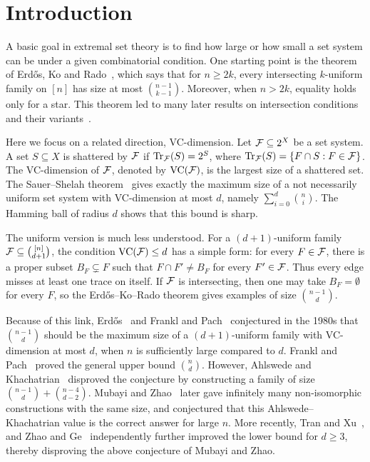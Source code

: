 \section{Introduction}

A basic goal in extremal set theory is to find how large or how small a set system can be under a given combinatorial condition. One starting point is the theorem of Erd\H{o}s, Ko and Rado~\cite{1961EKR}, which says that for \(n\ge2k\), every intersecting \(k\)-uniform family on \([n]\) has size at most \(\binom{n-1}{k-1}\). Moreover, when \(n>2k\), equality holds only for a star. This theorem led to many later results on intersection conditions and their variants~\cite{1989Chuan,2017PAMSHan,1967HM,2017HuangZhao,2024PengHuang,1986Pyber}.

Here we focus on a related direction, VC-dimension. Let \(\mathcal{F}\subseteq 2^X\) be a set system. A set \(S\subseteq X\) is shattered by \(\mathcal{F}\) if \(\operatorname{Tr}_{\mathcal{F}}(S)=2^S\), where \(\operatorname{Tr}_{\mathcal{F}}(S)=\{F\cap S:F\in\mathcal{F}\}\). The VC-dimension of \(\mathcal{F}\), denoted by \(\operatorname{VC}(\mathcal{F})\), is the largest size of a shattered set. The Sauer--Shelah theorem~\cite{1972JCTASauer,1972PACJMShelah,1971TPAVCVC} gives exactly the maximum size of a not necessarily uniform set system with VC-dimension at most \(d\), namely \(\sum_{i=0}^d\binom{n}{i}\). The Hamming ball of radius \(d\) shows that this bound is sharp.

The uniform version is much less understood. For a \((d+1)\)-uniform family \(\mathcal{F}\subseteq\binom{[n]}{d+1}\), the condition \(\operatorname{VC}(\mathcal{F})\le d\) has a simple form: for every \(F\in\mathcal{F}\), there is a proper subset \(B_F\subsetneq F\) such that \(F\cap F'\ne B_F\) for every \(F'\in\mathcal{F}\). Thus every edge misses at least one trace on itself. If \(\mathcal{F}\) is intersecting, then one may take \(B_F=\emptyset\) for every \(F\), so the Erd\H{o}s--Ko--Rado theorem gives examples of size \(\binom{n-1}{d}\).

Because of this link, Erd\H{o}s~\cite{1984Erdos} and Frankl and Pach~\cite{1984Franklpach} conjectured in the 1980s that \(\binom{n-1}{d}\) should be the maximum size of a \((d+1)\)-uniform family with VC-dimension at most \(d\), when \(n\) is sufficiently large compared to \(d\). Frankl and Pach~\cite{1984Franklpach} proved the general upper bound \(\binom{n}{d}\). However, Ahlswede and Khachatrian~\cite{1997CombFan} disproved the conjecture by constructing a family of size \(\binom{n-1}{d}+\binom{n-4}{d-2}\). Mubayi and Zhao~\cite{2007JAC} later gave infinitely many non-isomorphic constructions with the same size, and conjectured that this Ahlswede--Khachatrian value is the correct answer for large \(n\). More recently, Tran and Xu~\cite{2026TranXu}, and Zhao and Ge~\cite{2026GeZhao} independently further improved the lower bound for \(d\ge 3\), thereby disproving the above conjecture of Mubayi and Zhao.

